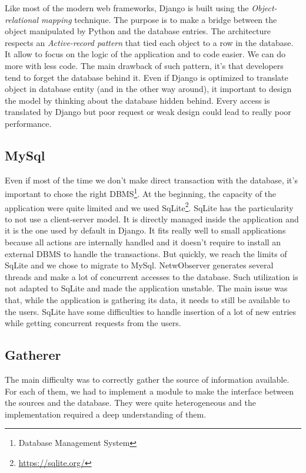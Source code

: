 Like most of the modern web frameworks, Django is built using the \emph{Object-relational mapping} technique. The purpose is to make a bridge between the object manipulated by Python and the database entries. The architecture respects an \emph{Active-record pattern} that tied each object to a row in the database. It allow to focus on the logic of the application and to code easier. We can do more with less code. The main drawback of such pattern, it's that developers tend to forget the database behind it. Even if Django is optimized to translate object in database entity (and in the other way around), it important to design the model by thinking about the database hidden behind. Every access is translated by Django but poor request or weak design could lead to really poor performance.

\subsection{MySql}
Even if most of the time we don't make direct transaction with the database, it's important to chose the right DBMS\footnote{Database Management System}. At the beginning, the capacity of the application were quite limited and we used SqLite\footnote{\url{https://sqlite.org/}}. SqLite has the particularity to not use a client-server model. It is directly managed inside the application and it is the one used by default in Django. It fits really well to small applications because all actions are internally handled and it doesn't require to install an external DBMS to handle the transactions. But quickly, we reach the limits of SqLite and we chose to migrate to MySql. NetwObserver generates several threads and make a lot of concurrent accesses to the database. Such utilization is not adapted to SqLite and made the application unstable. The main issue was that, while the application is gathering its data, it needs to still be available to the users. SqLite have some difficulties to handle insertion of a lot of new entries while getting concurrent requests from the users.

\subsection{Gatherer}
The main difficulty was to correctly gather the source of information available. For each of them, we had to implement a module to make the interface between the sources and the database. They were quite heterogeneous and the implementation required a deep understanding of them.
